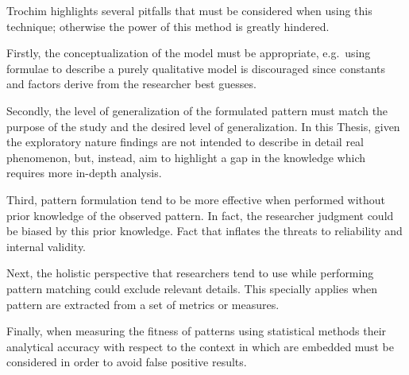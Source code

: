 
Trochim \cite{pattern_matching} highlights several pitfalls that must be considered when using this technique; otherwise the power of this method is greatly hindered. 

Firstly, the conceptualization of the model must be appropriate, e.g.\ using formulae to describe a purely qualitative model is discouraged since constants and factors derive from the researcher best guesses.

Secondly, the level of generalization of the formulated pattern must match the purpose of the study and the desired level of generalization. In this Thesis, given the exploratory nature findings are not intended to describe in detail real phenomenon, but, instead, aim to highlight a gap in the knowledge which requires more in-depth analysis.

Third, pattern formulation tend to be more effective when performed without prior knowledge of the observed pattern. In fact, the researcher judgment could be biased by this prior knowledge. Fact that inflates the threats to reliability and internal validity.

Next, the holistic perspective that researchers tend to use while performing pattern matching could exclude relevant details. This specially applies when pattern are extracted from a set of metrics or measures.

Finally, when measuring the fitness of patterns using statistical methods their analytical accuracy with respect to the context in which are embedded must be considered in order to avoid false positive results.


